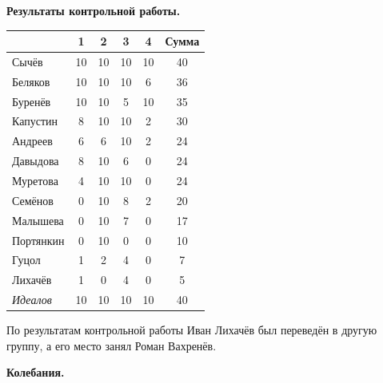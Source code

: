 \documentclass[12pt]{article}
\newlength{\h}
\newlength{\x}
\begin{document}
\begin{center}
  \textbf{Результаты контрольной работы. }
\end{center}

\begin{center}
  \begin{tabular}{|l|c|c|c|c|c|}
    \hline
    & 1 & 2 & 3 & 4 & Сумма \\
    \hline
    Сычёв & 10 & 10 & 10 & 10 & 40 \\
    \hline
    Беляков & 10 & 10 & 10 & 6 & 36 \\
    \hline
    Буренёв & 10 & 10 & 5 & 10 & 35 \\
    \hline
    Капустин & 8 & 10 & 10 & 2 & 30 \\
    \hline
    Андреев & 6 & 6 & 10 & 2 & 24 \\
    \hline
    Давыдова & 8 & 10 & 6 & 0 & 24 \\
    \hline
    Муретова & 4 & 10 & 10 & 0 & 24 \\
    \hline
    Семёнов & 0 & 10 & 8 & 2 & 20 \\
    \hline
    Малышева & 0 & 10 & 7 & 0 & 17 \\
    \hline
    Портянкин & 0 & 10 & 0 & 0 & 10 \\
    \hline
    Гуцол & 1 & 2 & 4 & 0 & 7 \\
    \hline
    Лихачёв & 1 & 0 & 4 & 0 & 5 \\
    \hline
    \textit{Идеалов} & 10 & 10 & 10 & 10 & 40 \\
    \hline
  \end{tabular}
\end{center}

По результатам контрольной работы Иван Лихачёв был переведён в другую
группу, а его место занял Роман Вахренёв. 


\begin{center}
  \textbf{Колебания. }
\end{center}
\end{document}
